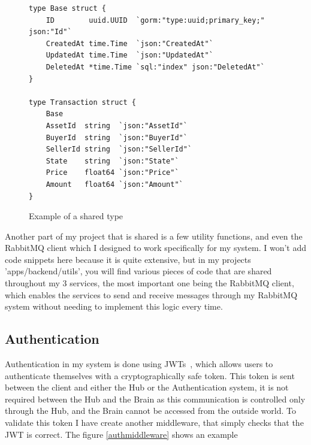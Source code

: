 \documentclass[titlepage]{article}
\begin{document}
\begin{figure}
  \begin{verbatim}
type Base struct {
	ID        uuid.UUID  `gorm:"type:uuid;primary_key;" json:"Id"`
	CreatedAt time.Time  `json:"CreatedAt"`
	UpdatedAt time.Time  `json:"UpdatedAt"`
	DeletedAt *time.Time `sql:"index" json:"DeletedAt"`
}

type Transaction struct {
	Base
	AssetId  string  `json:"AssetId"`
	BuyerId  string  `json:"BuyerId"`
	SellerId string  `json:"SellerId"`
	State    string  `json:"State"`
	Price    float64 `json:"Price"`
	Amount   float64 `json:"Amount"`
}
  \end{verbatim}
  \caption{Example of a shared type}
  \label{sharedtype}
\end{figure}

Another part of my project that is shared is a few utility functions, and even the RabbitMQ client which I designed to work specifically for my system. I won't add code snippets here because it is quite extensive, but in my projects 'apps/backend/utils', you will find various pieces of code that are shared throughout my 3 services, the most important one being the RabbitMQ client, which enables the services to send and receive messages through my RabbitMQ system without needing to implement this logic every time.

\pagebreak

\subsection{Authentication}
Authentication in my system is done using JWTs~\cite{jwt}, which allows users to authenticate themselves with a cryptographically safe token. This token is sent between the client and either the Hub or the Authentication system, it is not required between the Hub and the Brain as this communication is controlled only through the Hub, and the Brain cannot be accessed from the outside world. To validate this token I have create another middleware, that simply checks that the JWT is correct. The figure \ref{authmiddleware} shows an example
\end{document}
